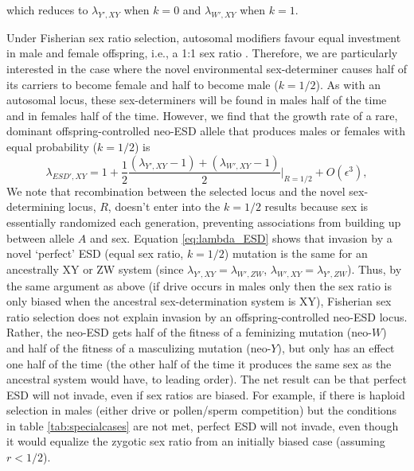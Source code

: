 \documentclass[12pt]{article}
\begin{document}
\noindent
which reduces to $\lambda_{Y',XY}$ when $k=0$ and $\lambda_{W',XY}$ when $k=1$. 

Under Fisherian sex ratio selection, autosomal modifiers favour equal investment in male and female offspring, i.e., a 1:1 sex ratio \citep{Fisher:1930wy,Charnov:1982wg,West:2009we}. 
Therefore, we are particularly interested in the case where the novel environmental sex-determiner causes half of its carriers to become female and half to become male ($k=1/2$). 
As with an autosomal locus, these sex-determiners will be found in males half of the time and in females half of the time.
However, we find that the growth rate of a rare, dominant offspring-controlled neo-ESD allele that produces males or females with equal probability ($k=1/2$) is
\begin{equation}
\lambda_{ESD',XY} =1+ \frac{1}{2}\frac{(\lambda_{Y',XY}-1) + (\lambda_{W',XY}-1)}{2} \Big|_{R=1/2} + O\left(\epsilon^3\right),
\label{eq:lambda_ESD}
\end{equation}
\noindent
We note that recombination between the selected locus and the novel sex-determining locus, $R$, doesn't enter into the $k=1/2$ results because sex is essentially randomized each generation, %
preventing associations from building up between allele $A$ and sex.  
Equation \eqref{eq:lambda_ESD} shows that invasion by a novel `perfect' ESD (equal sex ratio, $k=1/2$) mutation is the same for an ancestrally XY or ZW system (since $\lambda_{Y',XY} = \lambda_{W',ZW}$, $\lambda_{W',XY} = \lambda_{Y',ZW}$).
Thus, by the same argument as above (if drive occurs in males only then the sex ratio is only biased when the ancestral sex-determination system is XY), Fisherian sex ratio selection does not explain invasion by an offspring-controlled neo-ESD locus. 
Rather, the neo-ESD gets half of the fitness of a feminizing mutation (neo-$W$) and half of the fitness of a masculizing mutation (neo-$Y$), but only has an effect one half of the time (the other half of the time it produces the same sex as the ancestral system would have, to leading order). 
The net result can be that perfect ESD will not invade, even if sex ratios are biased. 
For example, if there is haploid selection in males (either drive or pollen/sperm competition) but the conditions in table \ref{tab:specialcases} are not met, perfect ESD will not invade, even though it would equalize the zygotic sex ratio from an initially biased case (assuming $r<1/2$). 
\end{document}
